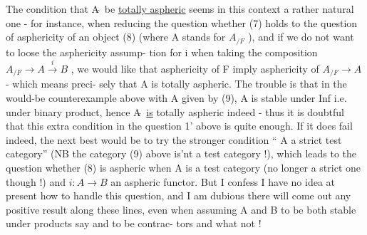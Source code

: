 The condition that A$\hat{\ }$ be \uline{totally aspheric}  seems in this context a
rather natural one  -  for instance,  when reducing the question whether
(7)  holds to the question of asphericity of an object (8) (where A stands
for  $A_{/F}$  ),  and if we do not want to loose the  asphericity assump-%
tion for i when taking the composition  $A_{/F} \to A \xrightarrow{i} B$ , we would like
that asphericity of F imply asphericity of $A_{/F} \to A$  -  which means preci-%
sely that A is totally aspheric.  The trouble is that in the would-be
counterexample above with A given by (9),  A is stable under Inf  i.e.
under binary product,  hence A$\hat{\ }$ \uline{is}  totally aspheric indeed  -  thus it
is doubtful that this extra condition in the question 1' above is
quite enough.  If it does fail indeed,  the next best would be to 
try the stronger condition `` A a strict test category''  (NB the category
(9) above is'nt a test category !),  which leads to the question whether
(8) is aspheric when A is a test category (no longer a strict one
though !)  and  $i : A \to B$ an aspheric functor.   But I confess I have
no idea at present how to handle this question,  and I am dubious there
will come out any positive result along these lines,  even when assuming
A and B to be both stable under  products  say\hand{,} and to be contrac-%
tors and what not !

